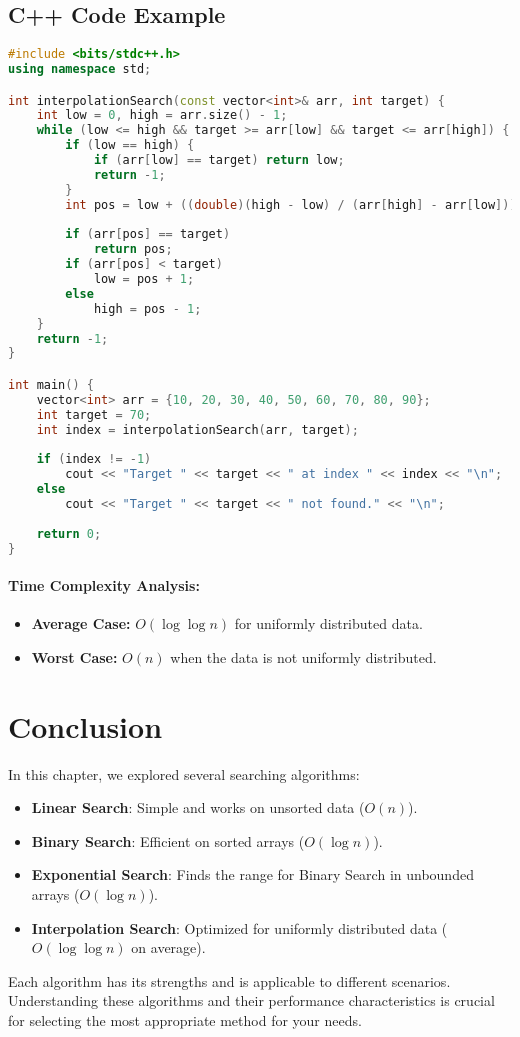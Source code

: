 \subsection{C++ Code Example}
\begin{lstlisting}[language=C++, caption={Interpolation Search Implementation}]
#include <bits/stdc++.h>
using namespace std;

int interpolationSearch(const vector<int>& arr, int target) {
    int low = 0, high = arr.size() - 1;
    while (low <= high && target >= arr[low] && target <= arr[high]) {
        if (low == high) {
            if (arr[low] == target) return low;
            return -1;
        }
        int pos = low + ((double)(high - low) / (arr[high] - arr[low])) * (target - arr[low]);
        
        if (arr[pos] == target)
            return pos;
        if (arr[pos] < target)
            low = pos + 1;
        else
            high = pos - 1;
    }
    return -1;
}

int main() {
    vector<int> arr = {10, 20, 30, 40, 50, 60, 70, 80, 90};
    int target = 70;
    int index = interpolationSearch(arr, target);
    
    if (index != -1)
        cout << "Target " << target << " at index " << index << "\n";
    else
        cout << "Target " << target << " not found." << "\n";
        
    return 0;
}
\end{lstlisting}

\paragraph{Time Complexity Analysis:}
\begin{itemize}
  \item \textbf{Average Case:} \(O(\log \log n)\) for uniformly distributed data.
  \item \textbf{Worst Case:} \(O(n)\) when the data is not uniformly distributed.
\end{itemize}

\section{Conclusion}
In this chapter, we explored several searching algorithms:
\begin{itemize}
  \item \textbf{Linear Search}: Simple and works on unsorted data (\(O(n)\)).
  \item \textbf{Binary Search}: Efficient on sorted arrays (\(O(\log n)\)).
  \item \textbf{Exponential Search}: Finds the range for Binary Search in unbounded arrays (\(O(\log n)\)).
  \item \textbf{Interpolation Search}: Optimized for uniformly distributed data (\(O(\log \log n)\) on average).
\end{itemize}

Each algorithm has its strengths and is applicable to different scenarios. Understanding these algorithms and their performance characteristics is crucial for selecting the most appropriate method for your needs.
